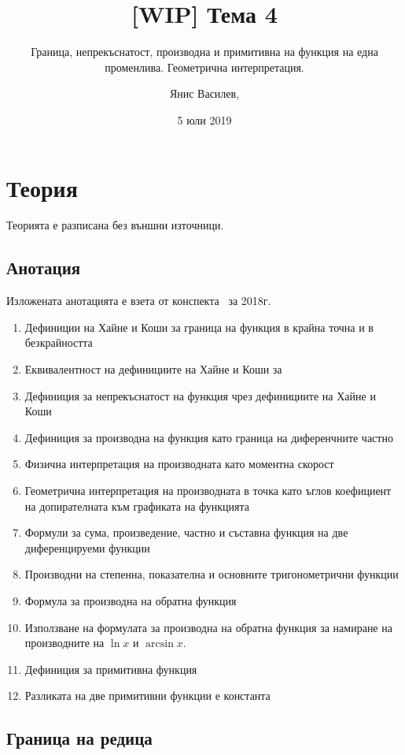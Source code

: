 \documentclass[numbers=endperiod, DIV=15, bibliography=totocnumbered]{scrartcl}
\title{[WIP] Тема 4}
\subtitle{Граница, непрекъснатост, производна и примитивна на функция на една променлива. Геометрична интерпретация.}
\author{Янис Василев, \Email{ianis@ivasilev.net}}
\date{5 юли 2019}
\begin{document}
\maketitle

\section{Теория}

Теорията е разписана без външни източници.

\subsection{Анотация}

Изложената анотацията е взета от конспекта~\cite{Syllabus} за 2018г.

\begin{enumerate}
  \item Дефиниции на Хайне и Коши за граница на функция в крайна точна и в безкрайността
  \item Еквивалентност на дефинициите на Хайне и Коши за
  \item Дефиниция за непрекъснатост на функция чрез дефинициите на Хайне и Коши
  \item Дефиниция за производна на функция като граница на диференчните частно
  \item Физична интерпретация на производната като моментна скорост
  \item Геометрична интерпретация на производната в точка като ъглов коефициент на допирателната към графиката на функцията
  \item Формули за сума, произведение, частно и съставна функция на две диференцируеми функции
  \item Производни на степенна, показателна и основните тригонометрични функции
  \item Формула за производна на обратна функция
  \item Използване на формулата за производна на обратна функция за намиране на производните на $\ln x$ и $\arcsin x$.
  \item Дефиниция за примитивна функция
  \item Разликата на две примитивни функции е константа
\end{enumerate}

\subsection{Граница на редица}
\end{document}
